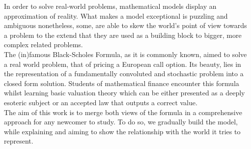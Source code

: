 \documentclass[../TGMAFFIRO.tex]{subfiles}
\begin{document}
In order to solve real-world problems, mathematical models display an approximation of reality. What makes a model exceptional is puzzling and ambiguous nonetheless, some, are able to skew the world's point of view towards a problem to the extend that they are used as a building block to bigger, more complex related problems.\\

The (in)famous Black-Scholes Formula, as it is commonly known, aimed to solve a real world problem, that of pricing a European call option. Its beauty, lies in the representation of a fundamentally convoluted and stochastic problem into a closed form solution. Students of mathematical finance encounter this formula whilst learning basic valuation theory which can be either presented as a deeply esoteric subject or an accepted law that outputs a correct value.\\

The aim of this work is to merge both views of the formula in a comprehensive approach for any newcomer to study. To do so, we gradually build the model, while explaining and aiming to show the relationship with the world it tries to represent.
\end{document}

